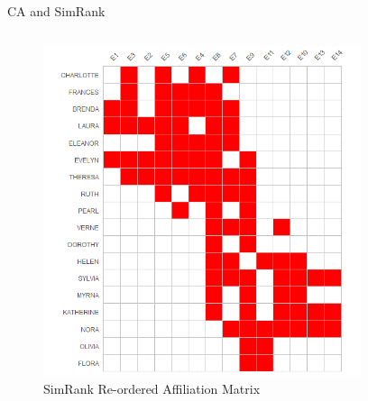 \documentclass[
  ignorenonframetext,
]{beamer}
\begin{document}
\begin{frame}{CA and SimRank}
\protect\hypertarget{ca-and-simrank-3}{}
\begin{columns}[T]
\begin{column}{0.5\textwidth}
\begin{figure}

{\centering \includegraphics{Plots/sr-plot-reord.png}

}

\caption{SimRank Re-ordered Affiliation Matrix}

\end{figure}
\end{column}

\begin{column}{0.5\textwidth}
\begin{figure}


\end{figure}
\end{column}
\end{columns}
\end{frame}
\end{document}
